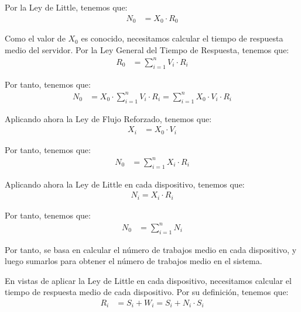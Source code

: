 \documentclass[12pt]{article}
\begin{document}
\begin{ejercicio}[2 puntos]
\begin{enumerate}
            Por la Ley de Little, tenemos que:
            \begin{align*}
                N_0 &= X_0\cdot R_0
            \end{align*}

            Como el valor de $X_0$ es conocido, necesitamos calcular el tiempo de respuesta medio del servidor. Por la Ley General del Tiempo de Respuesta, tenemos que:
            \begin{align*}
                R_0 &= \sum_{i=1}^{n} V_i\cdot R_i
            \end{align*}


            Por tanto, tenemos que:
            \begin{align*}
                N_0 &= X_0\cdot \sum_{i=1}^{n} V_i\cdot R_i
                = \sum_{i=1}^{n} X_0\cdot V_i\cdot R_i
            \end{align*}

            Aplicando ahora la Ley de Flujo Reforzado, tenemos que:
            \begin{align*}
                X_i &= X_0\cdot V_i
            \end{align*}

            Por tanto, tenemos que:
            \begin{align*}
                N_0 &= \sum_{i=1}^{n} X_i\cdot R_i
            \end{align*}

            Aplicando ahora la Ley de Little en cada dispositivo, tenemos que:
            \begin{align*}
                N_i = X_i\cdot R_i
            \end{align*}

            Por tanto, tenemos que:
            \begin{align*}
                N_0 &= \sum_{i=1}^{n} N_i
            \end{align*}

            Por tanto, se basa en calcular el número de trabajos medio en cada dispositivo, y luego sumarlos para obtener el número de trabajos medio en el sistema.

            En vistas de aplicar la Ley de Little en cada dispositivo, necesitamos calcular el tiempo de respuesta medio de cada dispositivo. Por su definición, tenemos que:
            \begin{align*}
                R_i &= S_i + W_i = S_i + N_i\cdot S_i
            \end{align*}


\end{enumerate}
\end{ejercicio}
\end{document}
